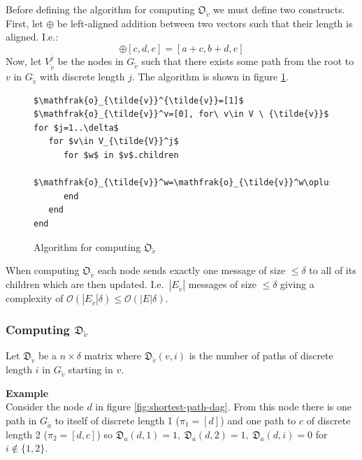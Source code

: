 \documentclass{article}
\begin{document}
Before defining the algorithm for computing $\mathfrak{O}_{\tilde{v}}$ we must define two constructs. First, let $\oplus$ be left-aligned addition between two vectors such that their length is aligned. I.e.:
\begin{equation}
[a, b] \oplus [c, d, e] = [a + c, b + d, e]
\end{equation}
Now, let $V_{\tilde{v}}^j$ be the nodes in $G_{\tilde{v}}$ such that there exists some path from the root to $v$ in $G_{\tilde{v}}$ with discrete length $j$. The algorithm is shown in figure \ref{algorithm:o}.

\begin{figure}[H]
\begin{lstlisting}
$\mathfrak{o}_{\tilde{v}}^{\tilde{v}}=[1]$
$\mathfrak{o}_{\tilde{v}}^v=[0], for\ v\in V \ {\tilde{v}}$
for $j=1..\delta$
   for $v\in V_{\tilde{V}}^j$
      for $w$ in $v$.children
         $\mathfrak{o}_{\tilde{v}}^w=\mathfrak{o}_{\tilde{v}}^w\oplus[0,\mathfrak{o}_{\tilde{v}}^v]$
      end
   end
end
\end{lstlisting}
\caption{Algorithm for computing $\mathfrak{O}_{\tilde{v}}$}
\label{algorithm:o}
\end{figure}

When computing $\mathfrak{O}_{\tilde{v}}$ each node sends exactly one message of size $\leq \delta$ to all of its children which are then updated. I.e.\ $|E_{\tilde{v}}|$ messages of size $\leq \delta$ giving a complexity of $\mathcal{O}(|E_{\tilde{v}}|\delta) \leq \mathcal{O}(|E|\delta)$.

\subsubsection{Computing $\mathfrak{D}_{\tilde{v}}$}

Let $\mathfrak{D}_{\tilde{v}}$ be a $n\times\delta$ matrix where $\mathfrak{D}_{\tilde{v}}(v, i)$ is the number of paths of discrete length $i$ in $G_{\tilde{v}}$ starting in $v$.

\textbf{Example}\\
Consider the node $d$ in figure \ref{fig:shortest-path-dag}. From this node there is one path in $G_{\tilde{a}}$ to itself of discrete length 1 ($\pi_1=[d]$) and one path to $c$ of discrete length 2 ($\pi_2=[d,c]$) so $\mathfrak{D}_a(d,1)=1,\ \mathfrak{D}_a(d,2)=1,\ \mathfrak{D}_a(d,i)=0$ for $i\notin\{1,2\}$.
\end{document}
